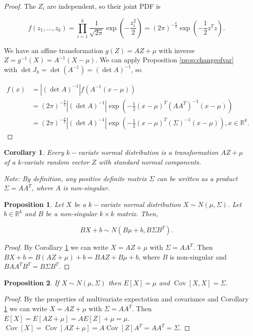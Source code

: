 \documentclass{book}
\theoremstyle{plain}%
\newtheorem{corollary}{Corollary}[section]
\newtheorem{proposition}{Proposition}[section]
\theoremstyle{definition}
\DeclareMathOperator{\Cov}{Cov}
\begin{document}
\begin{proof}
The $Z_i$ are independent, so their joint PDF is

$$f(z_1,...,z_k) = \prod_{i=1}^k \frac{1}{\sqrt{2\pi}}\exp(-\frac{z_i^2}{2}) = (2\pi)^{-\frac{k}{2}}\exp(-\frac{1}{2}z^Tz).$$

We have an affine transformation $g(Z) = AZ + \mu$ with inverse $Z = g^{-1}(X) = A^{-1}(X - \mu)$. We can apply Proposition \ref{prop:changeofvar} with $\det J_h = \det (A^{-1}) = (\det A)^{-1}$, so

\begin{align*}
f(x) &= |(\det A)^{-1}|f(A^{-1}(x - \mu))\\
&= (2\pi)^{-\frac{k}{2}}|(\det A)^{-1}|\exp\left(-\frac{1}{2}(x - \mu)^T(AA^T)^{-1}(x - \mu)\right)\\
&= (2\pi)^{-\frac{k}{2}}|(\det A)^{-1}|\exp\left(-\frac{1}{2}(x - \mu)^T(\Sigma)^{-1}(x - \mu)\right), x \in \mathbb{R}^k.
\end{align*}

\end{proof}

\begin{corollary}
Every $k-$variate normal distribution is a transformation $AZ + \mu$ of a $k$-variate random vector $Z$ with standard normal components. 

Note: By definition, any positive definite matrix $\Sigma$ can be written as a product $\Sigma = AA^T$, where $A$ is non-singular.\label{cor:mvn}
\end{corollary}

\begin{proposition}
Let $X$ be a $k-$variate normal distribution $X \sim N(\mu, \Sigma)$. Let $b \in \mathbb{R}^k$ and $B$ be a non-singular $k \times k$ matrix. Then,

$$BX + b \sim N(B\mu + b, B\Sigma B^T).$$
\end{proposition}

\begin{proof}
By Corollary \ref{cor:mvn} we can write $X = AZ + \mu$ with $\Sigma = AA^T$. Then $BX + b = B(AZ + \mu) + b = BAZ + B\mu + b$, where $B$ is non-singular and $BAA^TB^T = B\Sigma B^T$.
\end{proof}

\begin{proposition}
If $X \sim N(\mu, \Sigma)$ then $E[X] = \mu$ and $\Cov[X,X] = \Sigma$.\label{prop:mvnmean}
\end{proposition}

\begin{proof}
By the properties of multivariate expectation and covariance and Corollary \ref{cor:mvn} we can write $X = AZ + \mu$ with $\Sigma = AA^T$. Then $E[X] = E[AZ + \mu] = AE[Z] + \mu = \mu$. $\Cov[X] = \Cov[AZ + \mu] = A\Cov[Z]A^T = AA^T = \Sigma$.
\end{proof}
\end{document}
